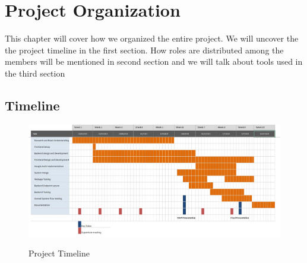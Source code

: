 \chapter{Project Organization}
\label{cha:projectorganization}


This chapter will cover how we organized the entire project. We will uncover the the project timeline in the first section. How roles are distributed among the members will be mentioned in second section and we will talk about tools used in the third section
\section{Timeline}
\begin{figure}[!ht]
	\centering
	\includegraphics[width=1\textwidth]{images/Timeline.jpg}\\
	\caption{Project Timeline}
	\label{fig:Project Timeline}
\end{figure}

